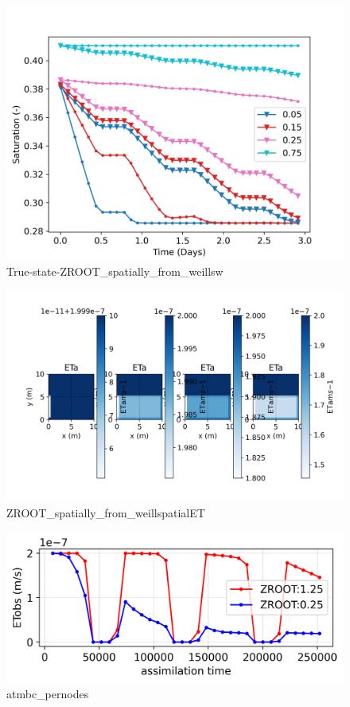 \documentclass{article}
\begin{document}
\begin{figure}[!htbp]
\centering
\includegraphics[width=0.75\linewidth]{files/ZROOT_spatially_from-0ce95c7463d4c2fe8a10cb04bfa38e8c.png}
\caption[]{True-state-ZROOT\_spatially\_from\_weillsw}
\label{true-state-ZROOT_spatially_from_weillsw}
\end{figure}

\begin{figure}[!htbp]
\centering
\includegraphics[width=0.75\linewidth]{files/ZROOT_spatially_from-e0b830dc4e6efc439d94598aafc098b2.png}
\caption[]{ZROOT\_spatially\_from\_weillspatialET}
\label{ZROOT_spatially_from_weillspatialET}
\end{figure}

\begin{figure}[!htbp]
\centering
\includegraphics[width=0.75\linewidth]{files/atmbc_pernodes-4453e76d81b2f73f09dec96e9257c4c1.png}
\caption[]{atmbc\_pernodes}
\label{atmbc_pernodes}
\end{figure}
\end{document}
